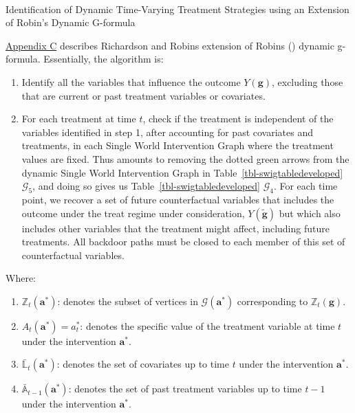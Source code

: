 \documentclass[
  single column]{article}
\makeatletter
\let\oldparagraph\paragraph
\renewcommand{\paragraph}{
    \@ifstar
      \xxxParagraphStar
      \xxxParagraphNoStar
  }
\newcommand{\xxxParagraphStar}[1]{\oldparagraph*{#1}\mbox{}}
\newcommand{\xxxParagraphNoStar}[1]{\oldparagraph{#1}\mbox{}}
\providecommand{\tightlist}{%
  \setlength{\itemsep}{0pt}\setlength{\parskip}{0pt}}\usepackage{longtable,booktabs,array}
\makeatother
\begin{document}
\paragraph{Identification of Dynamic Time-Varying Treatment Strategies
using an Extension of Robin's Dynamic
G-formula}\label{identification-of-dynamic-time-varying-treatment-strategies-using-an-extension-of-robins-dynamic-g-formula}

\hyperref[id-app-c]{Appendix C} describes Richardson and Robins
extension of Robins () dynamic g-formula.
Essentially, the algorithm is:

\begin{enumerate}
\def\labelenumi{\arabic{enumi}.}
\item
  Identify all the variables that influence the outcome
  \(Y(\mathbf{g})\), excluding those that are current or past treatment
  variables or covariates.
\item
  For each treatment at time \(t\), check if the treatment is
  independent of the variables identified in step 1, after accounting
  for past covariates and treatments, in each Single World Intervention
  Graph where the treatment values are fixed. Thus amounts to removing
  the dotted green arrows from the dynamic Single World Intervention
  Graph in Table~\ref{tbl-swigtabledeveloped} \(\mathcal{G}_5\), and
  doing so gives us Table~\ref{tbl-swigtabledeveloped}
  \(\mathcal{G}_4\). For each time point, we recover a set of future
  counterfactual variables that includes the outcome under the treat
  regime under consideration, \(Y(\mathbf{\tilde{g}})\) but which also
  includes other variables that the treatment might affect, including
  future treatments. All backdoor paths must be closed to each member of
  this set of counterfactual variables.
\end{enumerate}

Where:

\begin{enumerate}
\def\labelenumi{\arabic{enumi}.}
\tightlist
\item
  \textbf{\(\mathbb{Z}_t(\mathbf{a}^*)\)}: denotes the subset of
  vertices in \(\mathcal{G}(\mathbf{a}^*)\) corresponding to
  \(\mathbb{Z}_t(\mathbf{g})\).
\item
  \textbf{\(A_t(\mathbf{a}^*) = a^*_t\)}: denotes the specific value of
  the treatment variable at time \(t\) under the intervention
  \(\mathbf{a}^*\).
\item
  \textbf{\(\bar{\mathbb{L}}_t(\mathbf{a}^*)\)}: denotes the set of
  covariates up to time \(t\) under the intervention \(\mathbf{a}^*\).
\item
  \textbf{\(\bar{\mathbb{A}}_{t-1}(\mathbf{a}^*)\)}: denotes the set of
  past treatment variables up to time \(t-1\) under the intervention
  \(\mathbf{a}^*\).
\end{enumerate}
\end{document}

